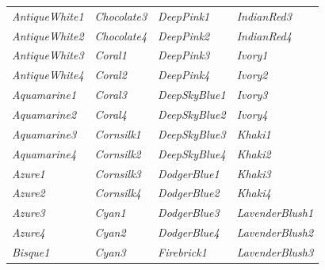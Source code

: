 \documentclass{article}
\newcommand\myfcolorbox[1]{\fcolorbox{black}{#1}{\phantom{\tiny{color}}} \textit{#1}\quad}
\begin{document}
	\begin{center}
		\begin{tabular}{llll}
			\myfcolorbox{AntiqueWhite1} & \myfcolorbox{Chocolate3} & \myfcolorbox{DeepPink1} & \myfcolorbox{IndianRed3} \\ 
			
			\myfcolorbox{AntiqueWhite2} & \myfcolorbox{Chocolate4} & \myfcolorbox{DeepPink2} & \myfcolorbox{IndianRed4} \\ 
			
			\myfcolorbox{AntiqueWhite3} & \myfcolorbox{Coral1} & \myfcolorbox{DeepPink3} & \myfcolorbox{Ivory1} \\ 
			
			\myfcolorbox{AntiqueWhite4} & \myfcolorbox{Coral2} & \myfcolorbox{DeepPink4} & \myfcolorbox{Ivory2} \\ 
			
			\myfcolorbox{Aquamarine1} & \myfcolorbox{Coral3} & \myfcolorbox{DeepSkyBlue1} & \myfcolorbox{Ivory3} \\
			
			\myfcolorbox{Aquamarine2} & \myfcolorbox{Coral4} & \myfcolorbox{DeepSkyBlue2} & \myfcolorbox{Ivory4} \\
			
			\myfcolorbox{Aquamarine3} & \myfcolorbox{Cornsilk1} & \myfcolorbox{DeepSkyBlue3} & \myfcolorbox{Khaki1} \\
			
			\myfcolorbox{Aquamarine4} & \myfcolorbox{Cornsilk2} & \myfcolorbox{DeepSkyBlue4} & \myfcolorbox{Khaki2} \\
			
			\myfcolorbox{Azure1} & \myfcolorbox{Cornsilk3} & \myfcolorbox{DodgerBlue1} & \myfcolorbox{Khaki3} \\
			
			\myfcolorbox{Azure2} & \myfcolorbox{Cornsilk4} & \myfcolorbox{DodgerBlue2} & \myfcolorbox{Khaki4} \\
			
			\myfcolorbox{Azure3} & \myfcolorbox{Cyan1} & \myfcolorbox{DodgerBlue3} & \myfcolorbox{LavenderBlush1} \\
			
			\myfcolorbox{Azure4} & \myfcolorbox{Cyan2} & \myfcolorbox{DodgerBlue4} & \myfcolorbox{LavenderBlush2} \\
			
			\myfcolorbox{Bisque1} & \myfcolorbox{Cyan3} & \myfcolorbox{Firebrick1} & \myfcolorbox{LavenderBlush3} \\
			

\end{tabular}
\end{center}
\end{document}
